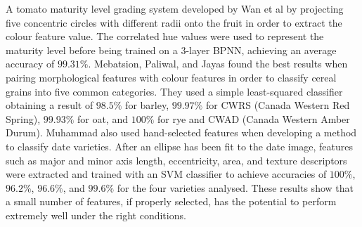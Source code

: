 \documentclass[fleqn,twoside]{article}
\begin{document}
A tomato maturity level grading system developed by Wan et al \cite{wan} by projecting five concentric circles with different radii onto the fruit in order to extract the colour feature value. The correlated hue values were used to represent the maturity level before being trained on a 3-layer BPNN, achieving an average accuracy of $99.31\%$. Mebatsion, Paliwal, and Jayas \cite{mebatsion} found the best results when pairing morphological features with colour features in order to classify cereal grains into five common categories. They used a simple least-squared classifier obtaining a result of $98.5\%$ for barley, $99.97\%$ for CWRS (Canada Western Red Spring), $99.93\%$ for oat, and $100\%$ for rye and CWAD (Canada Western Amber Durum). Muhammad \cite{muhammad} also used hand-selected features when developing a method to classify date varieties. After an ellipse has been fit to the date image, features such as major and minor axis length, eccentricity, area, and texture descriptors were extracted and trained with an SVM classifier to achieve accuracies of $100\%$, $96.2\%$, $96.6\%$, and $99.6\%$ for the four varieties analysed. These results show that a small number of features, if properly selected, has the potential to perform extremely well under the right conditions.
\end{document}
